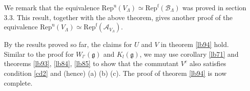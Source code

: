 \documentclass[11pt,b5paper,notitlepage]{article}
\theoremstyle{definition}
\theoremstyle{plain}
\newcommand{\mc}{\mathcal}
\newcommand{\Repu}{\mathrm{Rep}^{\mathrm u}}
\newcommand{\gk}{\mathfrak g}
\newcommand{\Repf}{\mathrm{Rep}^{\mathrm f}}
\numberwithin{equation}{subsection}
\begin{document}
We remark that the equivalence $\Repu(V_\Lambda)\simeq \Repf(\mc B_\Lambda)$ was proved in \cite{Bis18} section 3.3. This result, together with the above theorem, gives another proof of the equivalence $\Repu(V_\Lambda)\simeq \Repf(\mc A_{V_\Lambda})$.




By the results proved so far, the claims for $U$ and $V$ in theorem \ref{lb94} hold. Similar to the proof for $W_{l'}(\gk)$ and $K_l(\gk)$, we may use corollary \ref{lb71} and theorems \ref{lb93}, \ref{lb84}, \ref{lb85} to show that the commutant $V^c$ also satisfies condition \ref{cd2} and (hence) (a) (b) (c). The proof of theorem \ref{lb94} is now complete.





\newpage
\end{document}
